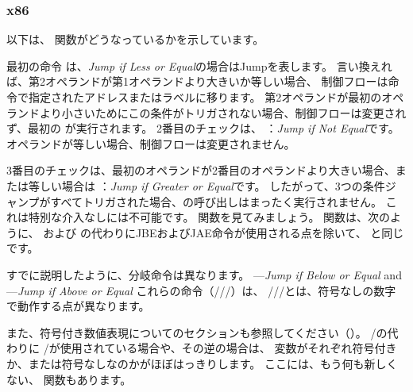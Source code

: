 \subsubsection{x86}


以下は、 関数がどうなっているかを示しています。




最初の命令 \JLE は、\emph{Jump if Less or Equal}の場合はJumpを表します。 
言い換えれば、第2オペランドが第1オペランドより大きいか等しい場合、
制御フローは命令で指定されたアドレスまたはラベルに移ります。 
第2オペランドが最初のオペランドより小さいためにこの条件がトリガされない場合、制御フローは変更されず、最初の \printf が実行されます。 
2番目のチェックは、 \JNE ：\emph{Jump if Not Equal}です。 
オペランドが等しい場合、制御フローは変更されません。

3番目のチェックは、最初のオペランドが2番目のオペランドより大きい場合、または等しい場合は \JGE ：\emph{Jump if Greater or Equal}です。 
したがって、3つの条件ジャンプがすべてトリガされた場合、\printf の呼び出しはまったく実行されません。 
これは特別な介入なしには不可能です。 
関数を見てみましょう。 
関数は、次のように、 \JLE および \JGE の代わりにJBEおよびJAE命令が使用される点を除いて、
と同じです。




すでに説明したように、分岐命令は異なります。
\JBE---\emph{Jump if Below or Equal} and \JAE---\emph{Jump if Above or Equal}
これらの命令（\JA/\JAE/\JB/\JBE）は、 \JG/\JGE/\JL/\JLE とは、符号なしの数字で動作する点が異なります。


また、符号付き数値表現についてのセクションも参照してください（）。 
\JA/\JB の代わりに \JG/\JL が使用されている場合や、その逆の場合は、
変数がそれぞれ符号付きか、または符号なしなのかがほぼはっきりします。
ここには、もう何も新しくない、 \main 関数もあります。

